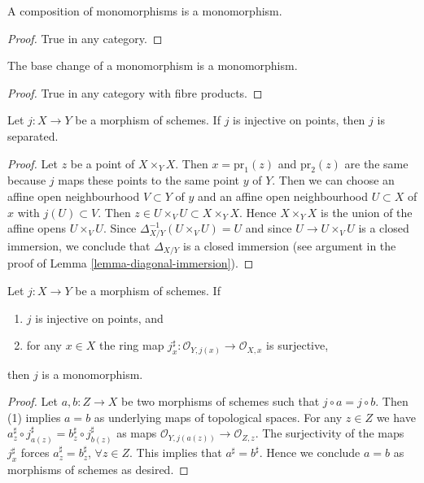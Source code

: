 \begin{lemma}
\label{lemma-composition-monomorphism}
A composition of monomorphisms is a monomorphism.
\end{lemma}

\begin{proof}
True in any category.
\end{proof}

\begin{lemma}
\label{lemma-base-change-monomorphism}
The base change of a monomorphism is a monomorphism.
\end{lemma}

\begin{proof}
True in any category with fibre products.
\end{proof}

\begin{lemma}
\label{lemma-injective-points}
Let $j : X \to Y$ be a morphism of schemes.
If $j$ is injective on points, then $j$ is separated.
\end{lemma}

\begin{proof}
Let $z$ be a point of $X \times_Y X$. Then $x = \text{pr}_1(z)$ and
$\text{pr}_2(z)$ are the same because $j$ maps these points to
the same point $y$ of $Y$. Then we can choose an affine
open neighbourhood $V \subset Y$ of $y$ and an affine open
neighbourhood $U \subset X$ of $x$ with $j(U) \subset V$.
Then $z \in U \times_V U \subset X \times_Y X$.
Hence $X \times_Y X$ is the union of the affine
opens $U \times_V U$. Since $\Delta_{X/Y}^{-1}(U \times_V U) = U$
and since $U \to U \times_V U$ is a closed immersion, we conclude
that $\Delta_{X/Y}$ is a closed immersion (see argument in the
proof of Lemma \ref{lemma-diagonal-immersion}).
\end{proof}

\begin{lemma}
\label{lemma-injective-points-surjective-stalks}
Let $j : X \to Y$ be a morphism of schemes.
If
\begin{enumerate}
\item $j$ is injective on points, and
\item for any $x \in X$ the ring map
$j^\sharp_x : \mathcal{O}_{Y, j(x)} \to \mathcal{O}_{X, x}$
is surjective,
\end{enumerate}
then $j$ is a monomorphism.
\end{lemma}

\begin{proof}
Let $a, b : Z \to X$ be two morphisms of schemes such that
$j \circ a  = j \circ b$.
Then (1) implies $a = b$ as underlying
maps of topological spaces.
For any $z \in Z$ we have
$a^\sharp_z \circ j^\sharp_{a(z)} = b^\sharp_z \circ j^\sharp_{b(z)}$
as maps $\mathcal{O}_{Y, j(a(z))} \to \mathcal{O}_{Z, z}$.
The surjectivity of the maps
$j^\sharp_x$ forces $a^\sharp_z = b^\sharp_z$, $\forall z \in Z$.
This implies that $a^\sharp = b^\sharp$.
Hence we conclude $a = b$ as morphisms of schemes
as desired.
\end{proof}

